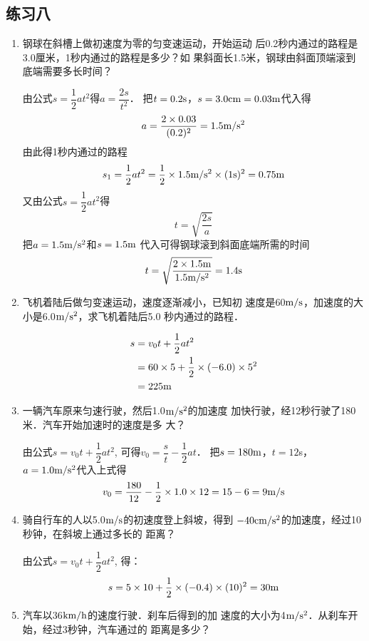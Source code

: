 \subsection{练习八}
\begin{enumerate}
\item      钢球在斜槽上做初速度为零的匀变速运动，开始运动
后0.2秒内通过的路程是3.0厘米，1秒内通过的路程是多少？如
果斜面长1.5米，钢球由斜面顶端滚到底端需要多长时间？
   
\begin{solution}
由公式$s=\dfrac{1}{2}at^2$得$a=\dfrac{2s}{t^2}$．
把$t=0.2{\rm s}$，$s=3.0{\rm cm}=0.03{\rm m}$代入得
\[a=\frac{2\times 0.03}{(0.2)^2}=1.5\text{m}/\text{s}^2\]
由此得1秒内通过的路程
\[s_1=\frac{1}{2}at^2=\frac{1}{2}\times1.5\text{m}/\text{s}^2\times(1{\rm s})^2=0.75{\rm m}\]
又由公式$s=\dfrac{1}{2}at^2$得
\[t=\sqrt{\frac{2s}{a}}\]
把$a=1.5\text{m}/\text{s}^2$和$s=1.5{\rm m}$
代入可得钢球滚到斜面底端所需的时间
\[t= \sqrt{\frac{2\times 1.5{\rm m}}{1.5\text{m}/\text{s}^2}}=1.4{\rm s} \] 
\end{solution}

\item     飞机着陆后做匀变速运动，速度逐渐减小，已知初
速度是60$\text{m}/\text{s}$，加速度的大小是6.0$\text{m}/\text{s}^2$，求飞机着陆后5.0
秒内通过的路程．
   
\begin{solution}
\[\begin{split}
    s&=v_0t+\frac{1}{2}at^2\\
    &=60\times 5+\frac{1}{2}\times (-6.0)\times 5^2\\
    &=225{\rm m}
\end{split}\]
\end{solution}

\item     一辆汽车原来匀速行驶，然后1.0$\text{m}/\text{s}^2$的加速度
加快行驶，经12秒行驶了180米．汽车开始加速时的速度是多
大？
   
\begin{solution}
由公式$s=v_0 t+\dfrac{1}{2}at^2$, 可得$v_0=\dfrac{s}{t}-\dfrac{1}{2}at$．
把$s=180{\rm m}$，$t=12$s，$a=1.0\text{m}/\text{s}^2$代入上式得
\[v_0=\frac{180}{12}-\frac{1}{2}\times 1.0\times 12=15-6=9\text{m}/\text{s}\]   
\end{solution}

\item     骑自行车的人以5.0$\text{m}/\text{s}$的初速度登上斜坡，得到
$-40{\rm cm}/{\rm s}^2$的加速度，经过10秒钟，在斜坡上通过多长的
距离？
   

\begin{solution}
    由公式$s=v_0 t+\dfrac{1}{2}at^2$, 得：
    \[s=5\times 10+\frac{1}{2}\times(-0.4)\times (10)^2=30{\rm m}\]
\end{solution}
\item    汽车以36$\text{km}/\text{h}$的速度行驶．刹车后得到的加
速度的大小为4$\text{m}/\text{s}^2$．从刹车开始，经过3秒钟，汽车通过的
距离是多少？
   

\end{enumerate}
